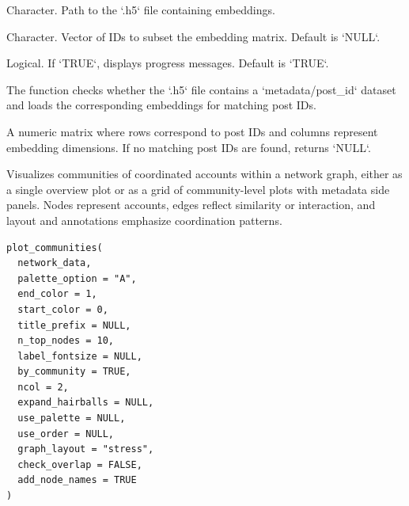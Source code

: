 \documentclass[a4paper]{book}
\begin{document}
%
\begin{Arguments}
\begin{ldescription}
\item[\code{path}] Character. Path to the `.h5` file containing embeddings.

\item[\code{ids\_subset}] Character. Vector of IDs to subset the embedding matrix. Default is `NULL`.

\item[\code{verbose}] Logical. If `TRUE`, displays progress messages. Default is `TRUE`.
\end{ldescription}
\end{Arguments}
%
\begin{Details}
The function checks whether the `.h5` file contains a `metadata/post\_id` dataset and loads the corresponding embeddings for matching post IDs.
\end{Details}
%
\begin{Value}
A numeric matrix where rows correspond to post IDs and columns represent embedding dimensions. If no matching post IDs are found, returns `NULL`.
\end{Value}
%
\begin{Description}
Visualizes communities of coordinated accounts within a network graph, either as a single overview plot
or as a grid of community-level plots with metadata side panels. Nodes represent accounts, edges reflect
similarity or interaction, and layout and annotations emphasize coordination patterns.
\end{Description}
%
\begin{Usage}
\begin{verbatim}
plot_communities(
  network_data,
  palette_option = "A",
  end_color = 1,
  start_color = 0,
  title_prefix = NULL,
  n_top_nodes = 10,
  label_fontsize = NULL,
  by_community = TRUE,
  ncol = 2,
  expand_hairballs = NULL,
  use_palette = NULL,
  use_order = NULL,
  graph_layout = "stress",
  check_overlap = FALSE,
  add_node_names = TRUE
)
\end{verbatim}
\end{Usage}
%
\end{document}
